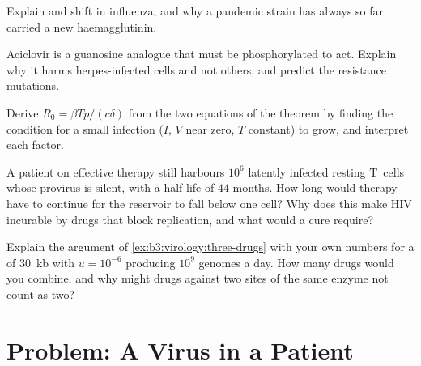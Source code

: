 \begin{exercise}[$\star\star$]\label{exo:b3:virology:8}
Explain  and shift in influenza, and why a pandemic
strain has always so far carried a new haemagglutinin.
\end{exercise}

\begin{exercise}[$\star\star$]\label{exo:b3:virology:9}
Aciclovir is a guanosine analogue that must be phosphorylated to act.
Explain why it harms herpes-infected cells and not others, and predict
the resistance mutations.
\end{exercise}

\begin{exercise}[$\star\star\star$]\label{exo:b3:virology:10}
Derive $R_{0} = \beta Tp/(c\delta)$ from the two equations of the
theorem by finding the condition for a small infection ($I$, $V$ near
zero, $T$ constant) to grow, and interpret each factor.
\end{exercise}

\begin{exercise}[$\star\star\star$]\label{exo:b3:virology:11}
A patient on effective therapy still harbours $10^{6}$ latently
infected resting T~cells whose provirus is silent, with a half-life of
$44$ months. How long would therapy have to continue for the reservoir
to fall below one cell? Why does this make HIV incurable by drugs that
block replication, and what would a cure require?
\end{exercise}

\begin{exercise}[$\star\star\star$]\label{exo:b3:virology:12}
Explain the argument of \cref{ex:b3:virology:three-drugs} with your own
numbers for a  of \qty{30}{kb} with $u = 10^{-6}$ producing $10^{9}$
genomes a day. How many drugs would you combine, and why might drugs
against two sites of the same enzyme not count as two?
\end{exercise}

\section{Problem: A Virus in a Patient}

